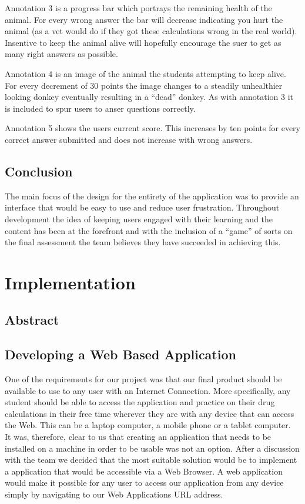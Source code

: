 \documentclass{l3proj}
\begin{document}
Annotation 3 is a progress bar which portrays the remaining health of the animal. For every wrong answer the bar will decrease indicating you hurt the animal (as a vet would do if they got these calculations wrong in the real world). Insentive to keep the animal alive will hopefully encourage the suer to get as many right answers as possible.

Annotation 4 is an image of the animal the students attempting to keep alive. For every decrement of 30 points the image changes to a steadily unhealthier looking donkey eventually resulting in a ``dead'' donkey. As with annotation 3 it is included to spur users to anser questions correctly.

Annotation 5 shows the users current score. This increases by ten points for every correct answer submitted and does not increase with wrong answers. 

\section{Conclusion}

The main focus of the design for the entirety of the application was to provide an interface that would be easy to use and reduce user frustration. Throughout development the idea of keeping users engaged with their learning and the content has been at the forefront and with the inclusion of a ``game'' of sorts on the final assessment the team believes they have succeeded in achieving this.

\chapter{Implementation}
\label{implementation}
\section{Abstract}
\section{Developing a Web Based Application }
One of the requirements for our project was that our final product should be available to 
use to any user with an Internet Connection. More specifically, any student should be 
able to access the application and practice on their drug calculations in their free time 
wherever they are with any device that can access the Web. This can be a laptop 
computer, a mobile phone or a tablet computer. \\ 
It was, therefore, clear to us that creating an application that needs to be installed on a 
machine in order to be usable was not an option. After a discussion with the team we 
decided that the most suitable solution would be to implement a application that would be 
accessible via a Web Browser. A web application would make it possible for any user to 
access our application from any device simply by navigating to our Web Applications 
URL address. \\ 
\end{document}
